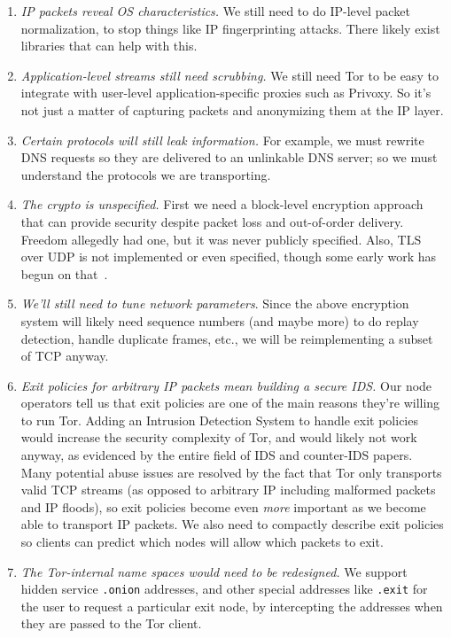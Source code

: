 \documentclass{llncs}
\begin{document}
\begin{enumerate}
\setlength{\itemsep}{0mm}
\setlength{\parsep}{0mm}
\item \emph{IP packets reveal OS characteristics.} We still need to do
IP-level packet normalization, to stop things like IP fingerprinting
attacks. There likely exist libraries that can help with this.
\item \emph{Application-level streams still need scrubbing.} We still need
Tor to be easy to integrate with user-level application-specific proxies
such as Privoxy. So it's not just a matter of capturing packets and
anonymizing them at the IP layer.
\item \emph{Certain protocols will still leak information.} For example,
we must rewrite DNS requests so they are
delivered to an unlinkable DNS server; so we must
understand the protocols we are transporting.
\item \emph{The crypto is unspecified.} First we need a block-level encryption
approach that can provide security despite
packet loss and out-of-order delivery. Freedom allegedly had one, but it was
never publicly specified.
Also, TLS over UDP is not implemented or even
specified, though some early work has begun on that~\cite{dtls}.
\item \emph{We'll still need to tune network parameters}. Since the above
encryption system will likely need sequence numbers (and maybe more) to do
replay detection, handle duplicate frames, etc., we will be reimplementing
a subset of TCP anyway.
\item \emph{Exit policies for arbitrary IP packets mean building a secure
IDS\@.}  Our node operators tell us that exit policies are one of
the main reasons they're willing to run Tor.
Adding an Intrusion Detection System to handle exit policies would
increase the security complexity of Tor, and would likely not work anyway,
as evidenced by the entire field of IDS and counter-IDS papers. Many
potential abuse issues are resolved by the fact that Tor only transports
valid TCP streams (as opposed to arbitrary IP including malformed packets
and IP floods), so exit policies become even \emph{more} important as
we become able to transport IP packets. We also need to compactly
describe exit policies so clients can predict
which nodes will allow which packets to exit.
\item \emph{The Tor-internal name spaces would need to be redesigned.} We
support hidden service {\tt{.onion}} addresses, and other special addresses
like {\tt{.exit}} for the user to request a particular exit node,
by intercepting the addresses when they are passed to the Tor client.
\end{enumerate}
\end{document}
